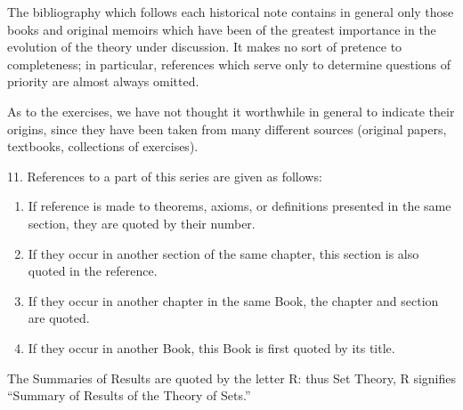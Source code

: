 The bibliography which follows each historical note contains in general only those books and original memoirs which have been of the greatest importance in the evolution of the theory under discussion. It makes no sort of pretence to completeness; in particular, references which serve only to determine questions of priority are almost always omitted.

As to the exercises, we have not thought it worthwhile in general to indicate their origins, since they have been taken from many different sources (original papers, textbooks, collections of exercises).

11. References to a part of this series are given as follows:\par

\begin{enumerate}
\def\labelenumi{\alph{enumi})}
\item
  If reference is made to theorems, axioms, or definitions presented in the same section, they are quoted by their number.
\item
  If they occur in another section of the same chapter, this section is also quoted in the reference.
\item
  If they occur in another chapter in the same Book, the chapter and section are quoted.
\item
  If they occur in another Book, this Book is first quoted by its title.
\end{enumerate}

The Summaries of Results are quoted by the letter R: thus Set Theory, R signifies ``Summary of Results of the Theory of Sets.''

